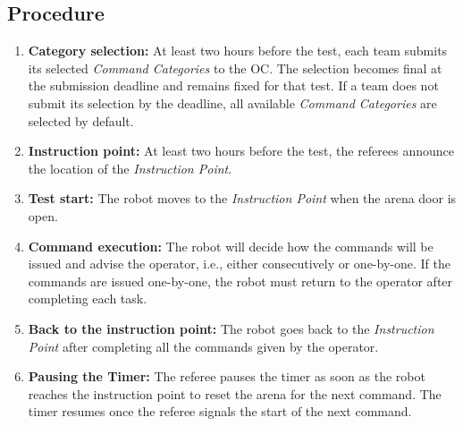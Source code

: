 \subsection*{Procedure}
\begin{enumerate}[nosep]
	\item \textbf{Category selection:} At least two hours before the test, each team submits its selected \textit{Command Categories} to the OC. The selection becomes final at the submission deadline and remains fixed for that test. If a team does not submit its selection by the deadline, all available \textit{Command Categories} are selected by default.
	\item \textbf{Instruction point:} At least two hours before the test, the referees announce the location of the \textit{Instruction Point}.
	\item \textbf{Test start:} The robot moves to the \textit{Instruction Point} when the arena door is open.
	\item \textbf{Command execution:} The robot will decide how the commands will be issued and advise the operator, i.e., either consecutively or one-by-one. If the commands are issued one-by-one, the robot must return to the operator after completing each task.
	\item \textbf{Back to the instruction point:} The robot goes back to the \textit{Instruction Point} after completing all the commands given by the operator.
	\item \textbf{Pausing the Timer:} The referee pauses the timer as soon as the robot reaches the instruction point to reset the arena for the next command. The timer resumes once the referee signals the start of the next command.
\end{enumerate}


